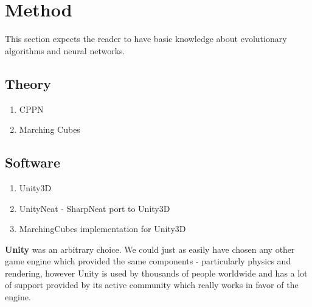 \section{Method}
This section expects the reader to have basic knowledge about evolutionary algorithms and neural networks.

\subsection{Theory}
\begin{enumerate}
    \item CPPN
    \item Marching Cubes
\end{enumerate}



\subsection{Software}
\begin{enumerate}
    \item Unity3D
    \item UnityNeat - SharpNeat port to Unity3D
    \item MarchingCubes implementation for Unity3D
\end{enumerate}
    
\textbf{Unity} was an arbitrary choice. We could just as easily have chosen any other game engine which provided the same components - particularly physics and rendering, however Unity is used by thousands of people worldwide and has a lot of support provided by its active community which really works in favor of the engine.
